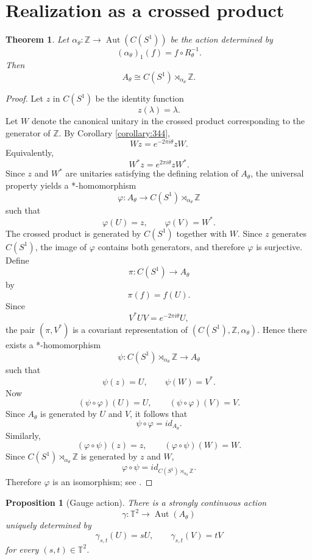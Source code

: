 \documentclass{book}
\newtheorem{proposition}[definition]{Proposition}
\newtheorem{theorem}[definition]{Theorem}
\begin{document}
\section{Realization as a crossed product}
\begin{theorem}\label{theorem:noncommutativeTorusCrossedProduct}
Let \(\alpha_\theta:\mathbb Z\to\operatorname{Aut}(C(S^1))\) be the action determined by
\[
(\alpha_\theta)_1(f)=f\circ R_\theta^{-1}.
\]
Then
\[
A_\theta
\cong
C(S^1)\rtimes_{\alpha_\theta}\mathbb Z .
\]
\end{theorem}
\begin{proof}
  Let \(z\) in \(C(S^1)\) be the identity function
  \[
  z(\lambda)=\lambda.
  \]
  Let \(W\) denote the canonical unitary in the crossed product corresponding to the generator of \(\mathbb Z\). By Corollary \ref{corollary:344},
  \[
  Wz=e^{-2\pi i\theta}zW.
  \]
  Equivalently,\[
  W^*z=e^{2\pi i\theta}zW^*.
  \]
  Since \(z\) and \(W^*\) are unitaries satisfying the defining
  relation of \(A_\theta\), the universal property yields a *-homomorphism
  \[
  \varphi:A_\theta\to C(S^1)\rtimes_{\alpha_\theta}\mathbb Z
  \]
  such that
  \[
  \varphi(U)=z,
  \qquad
  \varphi(V)=W^*.
  \]
  The crossed product is generated by \(C(S^1)\) together with \(W\). Since \(z\) generates \(C(S^1)\), the image 
  of \(\varphi\) contains both generators, and therefore \(\varphi\) is surjective. Define
  \[
  \pi:C(S^1)\to A_\theta
  \]
  by
  \[
  \pi(f)=f(U).
  \]
  Since
  \[
  V^*UV=e^{-2\pi i\theta}U,
  \]
  the pair \((\pi,V^*)\) is a covariant representation of \((C(S^1),\mathbb Z,\alpha_\theta)\). Hence there exists a *-homomorphism
  \[
  \psi:C(S^1)\rtimes_{\alpha_\theta}\mathbb Z\to A_\theta
  \]
  such that
  \[
  \psi(z)=U,
  \qquad
  \psi(W)=V^*.
  \]
  Now
  \[
  (\psi\circ\varphi)(U)=U,
  \qquad
  (\psi\circ\varphi)(V)=V.
  \]
  Since \(A_\theta\) is generated by \(U\) and \(V\), it follows that
  \[
  \psi\circ\varphi=id_{A_\theta}.
  \]
  Similarly,
  \[
  (\varphi\circ\psi)(z)=z,
  \qquad
  (\varphi\circ\psi)(W)=W.
  \]
  Since \(C(S^1)\rtimes_{\alpha_\theta}\mathbb Z\) is generated by \(z\) and \(W\),
  \[
  \varphi\circ\psi=id_{C(S^1)\rtimes_{\alpha_\theta}\mathbb Z}.
  \]
  Therefore \(\varphi\) is an isomorphism; see \cite[Sections~2.2, 2.3 and 2.6]{Williams2007}.
\end{proof}

\begin{proposition}[Gauge action]\label{prop:gaugeAction}
There is a strongly continuous action
\[
\gamma:\mathbb T^2\longrightarrow\operatorname{Aut}(A_\theta)
\]
uniquely determined by
\[
\gamma_{s,t}(U)=sU,
\qquad
\gamma_{s,t}(V)=tV
\]
for every \((s,t)\in\mathbb T^2\).
\end{proposition}
\end{document}
